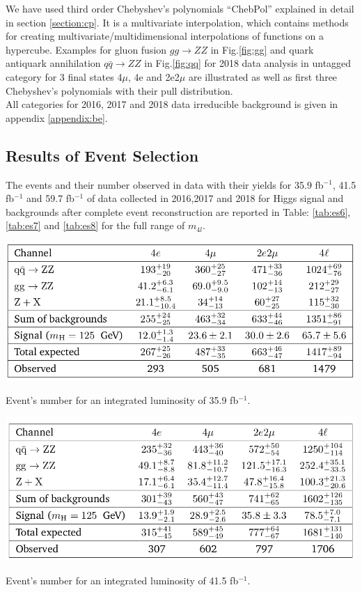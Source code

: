 We have used third order Chebyshev's polynomials ``ChebPol'' explained in detail in section \ref{section:cp}. It is a multivariate interpolation, which contains methods for creating multivariate/multidimensional interpolations of functions on a hypercube. Examples for gluon fusion $gg \rightarrow ZZ$ in Fig.\ref{fig:gg} and quark antiquark annihilation $q \bar{q} \rightarrow ZZ$ in Fig.\ref{fig:qq} for 2018 data analysis in untagged category for 3 final states 4$\mu$, 4e and 2e2$\mu$ are illustrated as well as first three Chebyshev's polynomials with their pull distribution.\\
All categories for 2016, 2017 and 2018 data irreducible background is given in appendix \ref{appendix:be}.
\clearpage
\subsection{Results of Event Selection}
The events and their number observed in data with their yields for 35.9 fb$^{-1}$, 41.5 fb$^{-1}$ and 59.7 fb$^{ -1}$ of data collected in 2016,2017 and 2018 for Higgs signal and backgrounds after complete event reconstruction are reported in Table: \ref{tab:es6}, \ref{tab:es7} and \ref{tab:es8} for the full range of $m_{4l}$.
\begin{table}
    \centering
   \includegraphics[scale=0.4]{images/es6.png}
    \caption{Event's number for an integrated luminosity of 35.9 fb$^{-1}$.}
    \label{tab:es6}
\end{table}
\begin{table}
    \centering
   \includegraphics[scale=0.4]{images/es7.png}
    \caption{Event's number for an integrated luminosity of 41.5 fb$^{-1}$.}
    \label{tab:es7}
\end{table}
